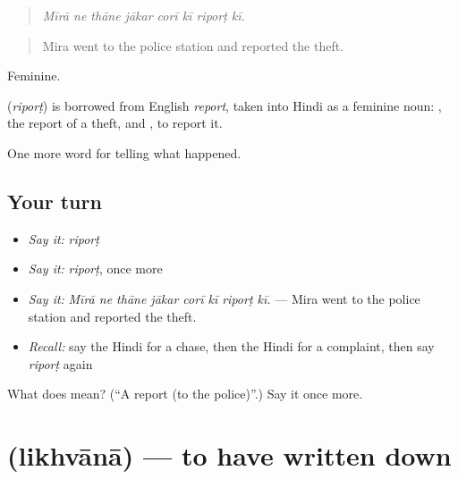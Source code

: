 \begin{quote}
       
\end{quote}

\begin{quote}
\emph{Mīrā ne thāne jākar corī kī riporṭ kī.}
\end{quote}

\begin{quote}
Mira went to the police station and reported the theft.
\end{quote}

Feminine.

\begin{cousinweb}
\textbf{} (\emph{riporṭ}) is borrowed from English \emph{report}, taken into Hindi as a feminine noun: \textbf{  }, the report of a theft, and \textbf{ }, to report it.
\end{cousinweb}

\begin{grammarlens}[title={What you've built}]
One more word for telling what happened.
\end{grammarlens}

\subsection*{Your turn}
\begin{itemize}
\raggedright
  \item \emph{Say it:} \emph{riporṭ}
  \item \emph{Say it:} \emph{riporṭ}, once more
  \item \emph{Say it:} \emph{Mīrā ne thāne jākar corī kī riporṭ kī.} — Mira went to the police station and reported the theft.
  \item \emph{Recall:} say the Hindi for a chase, then the Hindi for a complaint, then say \emph{riporṭ} again
\end{itemize}

\begin{tcolorbox}[breakable,colback=teal!4,colframe=teal!35!black,title={Before you move on}]
What does  mean? (\textquotedblleft{}A report (to the police)\textquotedblright{}.) Say it once more.
\end{tcolorbox}
\section[\texorpdfstring{\hi{लिखवाना} (likhvānā)}{लिखवाना (likhvānā)}]{ (likhvānā) — to have written down}


